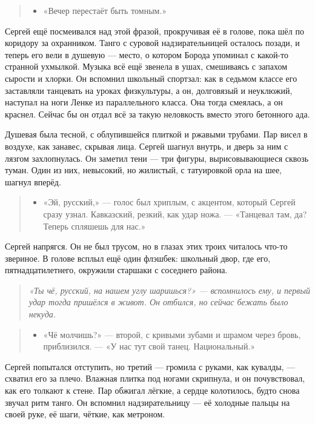 \documentclass[12pt,a4paper]{book}
\newenvironment{dialogue}{\begin{quote}\itshape\begin{itemize}\item[]}{\end{itemize}\end{quote}}
\newenvironment{innerthought}{\begin{quote}\small\itshape}{\end{quote}}
\begin{document}
\begin{dialogue}
    «Вечер перестаёт быть томным.»
\end{dialogue}

Сергей ещё посмеивался над этой фразой, прокручивая её в голове, пока шёл по коридору за охранником. Танго с суровой надзирательницей осталось позади, и теперь его вели в душевую --- место, о котором Борода упоминал с какой-то странной ухмылкой. Музыка всё ещё звенела в ушах, смешиваясь с запахом сырости и хлорки. Он вспомнил школьный спортзал: как в седьмом классе его заставляли танцевать на уроках физкультуры, а он, долговязый и неуклюжий, наступал на ноги Ленке из параллельного класса. Она тогда смеялась, а он краснел. Сейчас бы он отдал всё за такую неловкость вместо этого бетонного ада.

Душевая была тесной, с облупившейся плиткой и ржавыми трубами. Пар висел в воздухе, как занавес, скрывая лица. Сергей шагнул внутрь, и дверь за ним с лязгом захлопнулась. Он заметил тени --- три фигуры, вырисовывающиеся сквозь туман. Один из них, невысокий, но жилистый, с татуировкой орла на шее, шагнул вперёд.

\begin{dialogue}
«Эй, русский,» --- голос был хриплым, с акцентом, который Сергей сразу узнал. Кавказский, резкий, как удар ножа. --- «Танцевал там, да? Теперь спляшешь для нас.»
\end{dialogue}

Сергей напрягся. Он не был трусом, но в глазах этих троих читалось что-то звериное. В голове всплыл ещё один флэшбек: школьный двор, где его, пятнадцатилетнего, окружили старшаки с соседнего района.

\begin{innerthought}
«Ты чё, русский, на нашем углу шаришься?» --- вспомнилось ему, и первый удар тогда пришёлся в живот. Он отбился, но сейчас бежать было некуда.
\end{innerthought}

\begin{dialogue}
«Чё молчишь?» --- второй, с кривыми зубами и шрамом через бровь, приблизился. --- «У нас тут свой танец. Национальный.»
\end{dialogue}

Сергей попытался отступить, но третий --- громила с руками, как кувалды, --- схватил его за плечо. Влажная плитка под ногами скрипнула, и он почувствовал, как его толкают к стене. Пар обжигал лёгкие, а сердце колотилось, будто снова звучал ритм танго. Он вспомнил надзирательницу --- её холодные пальцы на своей руке, её шаги, чёткие, как метроном.
\end{document}
